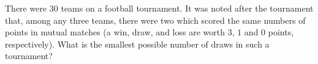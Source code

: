 \problem
There were $30$ teams on a football tournament.
It was noted after the tournament that, among any three teams, there were two
which scored the same numbers of points in mutual matches
(a win, draw, and loss are worth $3$, $1$ and $0$ points, respectively).
What is the smallest possible number of draws in such a tournament?
\solution
\endproblem
